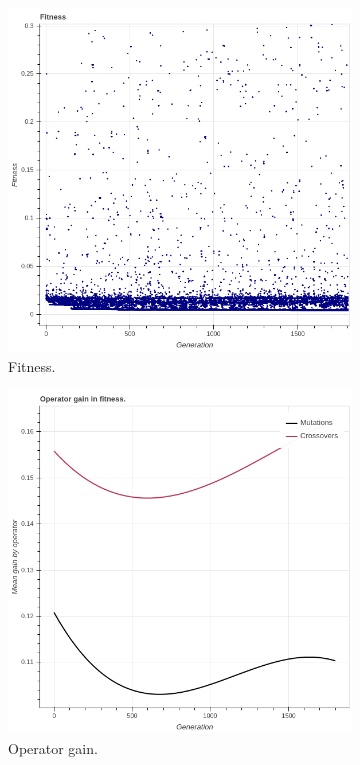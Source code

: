  \begin{figure}
    \begin{subfigure}{0.5\textwidth}
        \includegraphics[width=0.8\linewidth]{figures/incrementalfitness30.png}
        \caption{Fitness.}
    \end{subfigure}
    \begin{subfigure}{0.5\textwidth}
        \includegraphics[width=0.8\linewidth]{figures/incrementaloperatorgain30.png}
        \caption{Operator gain.}
    \end{subfigure}
        \begin{subfigure}{0.5\textwidth}

\end{subfigure}
\end{figure}
